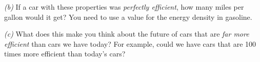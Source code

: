\documentclass[12pt]{article}
\begin{document}
\textsl{(b)} If a car with these properties was \emph{perfectly
  efficient}, how many miles per gallon would it get? You need to use a value for
the energy density in gasoline.

\textsl{(c)} What does this
make you think about the future of cars that are \emph{far more
  efficient} than cars we have today? For example, could we have cars
that are 100 times more efficient than today's cars?
\end{document}

